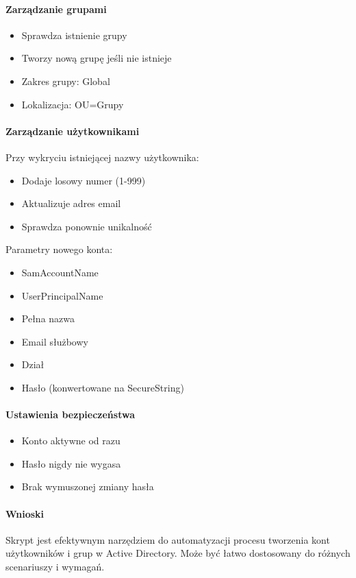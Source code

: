 \paragraph{Zarządzanie grupami}
\begin{itemize}
    \item Sprawdza istnienie grupy
    \item Tworzy nową grupę jeśli nie istnieje
    \item Zakres grupy: Global
    \item Lokalizacja: OU=Grupy
\end{itemize}

\paragraph{Zarządzanie użytkownikami}
Przy wykryciu istniejącej nazwy użytkownika:
\begin{itemize}
    \item Dodaje losowy numer (1-999)
    \item Aktualizuje adres email
    \item Sprawdza ponownie unikalność
\end{itemize}

Parametry nowego konta:
\begin{itemize}
    \item SamAccountName
    \item UserPrincipalName
    \item Pełna nazwa
    \item Email służbowy
    \item Dział
    \item Hasło (konwertowane na SecureString)
\end{itemize}

\paragraph{Ustawienia bezpieczeństwa}
\begin{itemize}
    \item Konto aktywne od razu
    \item Hasło nigdy nie wygasa
    \item Brak wymuszonej zmiany hasła
\end{itemize}


\paragraph{Wnioski}
Skrypt jest efektywnym narzędziem do automatyzacji procesu tworzenia kont użytkowników i grup w Active Directory. Może być łatwo dostosowany do różnych scenariuszy i wymagań.

